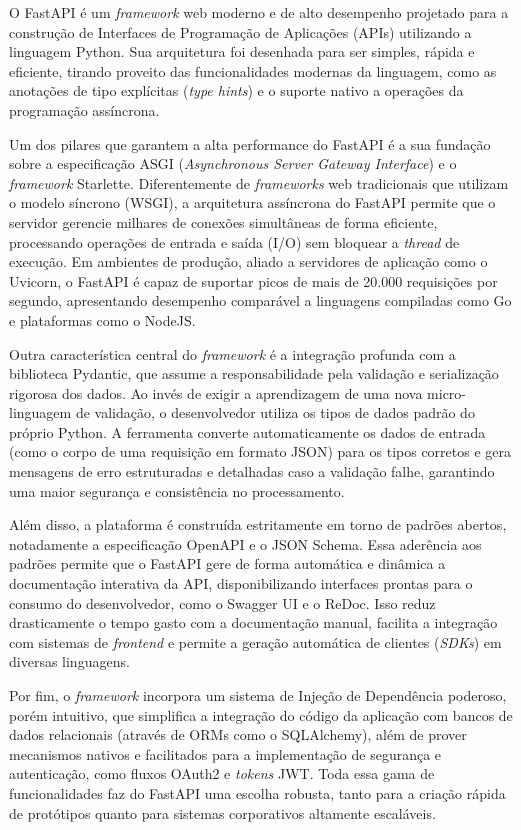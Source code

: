 O FastAPI é um \textit{framework} web moderno e de alto desempenho projetado para a construção de Interfaces de Programação de Aplicações (APIs) utilizando a linguagem Python. Sua arquitetura foi desenhada para ser simples, rápida e eficiente, tirando proveito das funcionalidades modernas da linguagem, como as anotações de tipo explícitas (\textit{type hints}) e o suporte nativo a operações da programação assíncrona.

Um dos pilares que garantem a alta performance do FastAPI é a sua fundação sobre a especificação ASGI (\textit{Asynchronous Server Gateway Interface}) e o \textit{framework} Starlette. Diferentemente de \textit{frameworks} web tradicionais que utilizam o modelo síncrono (WSGI), a arquitetura assíncrona do FastAPI permite que o servidor gerencie milhares de conexões simultâneas de forma eficiente, processando operações de entrada e saída (I/O) sem bloquear a \textit{thread} de execução. Em ambientes de produção, aliado a servidores de aplicação como o Uvicorn, o FastAPI é capaz de suportar picos de mais de 20.000 requisições por segundo, apresentando desempenho comparável a linguagens compiladas como Go e plataformas como o NodeJS.

Outra característica central do \textit{framework} é a integração profunda com a biblioteca Pydantic, que assume a responsabilidade pela validação e serialização rigorosa dos dados. Ao invés de exigir a aprendizagem de uma nova micro-linguagem de validação, o desenvolvedor utiliza os tipos de dados padrão do próprio Python. A ferramenta converte automaticamente os dados de entrada (como o corpo de uma requisição em formato JSON) para os tipos corretos e gera mensagens de erro estruturadas e detalhadas caso a validação falhe, garantindo uma maior segurança e consistência no processamento.

Além disso, a plataforma é construída estritamente em torno de padrões abertos, notadamente a especificação OpenAPI e o JSON Schema. Essa aderência aos padrões permite que o FastAPI gere de forma automática e dinâmica a documentação interativa da API, disponibilizando interfaces prontas para o consumo do desenvolvedor, como o Swagger UI e o ReDoc. Isso reduz drasticamente o tempo gasto com a documentação manual, facilita a integração com sistemas de \textit{frontend} e permite a geração automática de clientes (\textit{SDKs}) em diversas linguagens.

Por fim, o \textit{framework} incorpora um sistema de Injeção de Dependência poderoso, porém intuitivo, que simplifica a integração do código da aplicação com bancos de dados relacionais (através de ORMs como o SQLAlchemy), além de prover mecanismos nativos e facilitados para a implementação de segurança e autenticação, como fluxos OAuth2 e \textit{tokens} JWT. Toda essa gama de funcionalidades faz do FastAPI uma escolha robusta, tanto para a criação rápida de protótipos quanto para sistemas corporativos altamente escaláveis.

